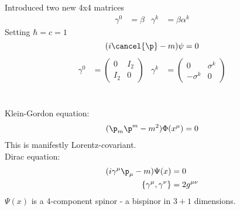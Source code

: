 \documentclass[a4paper, 11pt, normalem]{report}
\begin{document}
Introduced two new 4x4 matrices
\begin{align}
    \gamma^0 &= \beta & \gamma^k &= \beta\alpha^k
\end{align}
Setting $\hbar = c = 1$
\begin{equation}
    (i\cancel{\p} - m)\psi = 0
\end{equation}
\begin{align}
    \gamma^0 &= \begin{pmatrix} 0 & I_2 \\ I_2 & 0 \end{pmatrix} & \gamma^k &= \begin{pmatrix} 0 & \sigma^k \\ -\sigma^k & 0 \end{pmatrix}
\end{align}

\chapter{}
Klein-Gordon equation:
\begin{align}
    (\p_m\p^m - m^2)\Phi(x^\mu) = 0
\end{align}
This is manifestly Lorentz-covariant.\\
Dirac equation:
\begin{align}
    (i\gamma^\mu\p_\mu - m)\Psi(x) &= 0 \\
    \{\gamma^\mu,\gamma^\nu\} &= 2g^{\mu\nu}
\end{align}
$\Psi(x)$ is a 4-component spinor - a bispinor in $3+1$ dimensions.
\end{document}
